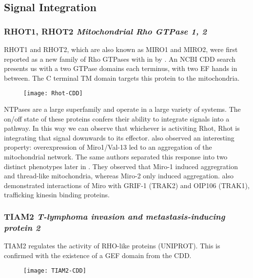 \subsection{Signal Integration}

\subsubsection{RHOT1, RHOT2 \textit{Mitochondrial Rho GTPase 1, 2}}

RHOT1 and RHOT2, which are also known as MIRO1 and MIRO2, were first reported as
a new family of Rho GTPases with in \citeyear{Fransson2003} by
\citeauthor{Fransson2003}. An NCBI CDD search presents us with a two GTPase
domains each terminus, with two EF hands in between. The C terminal TM domain
targets this protein to the mitochondria.

\begin{figure}[h]
  \texttt{[image: Rhot-CDD]}
\end{figure}

NTPases are a large superfamily and operate in a large variety of systems. The
on/off state of these proteins confers their ability to integrate signals into a
pathway. In this way we can observe that whichever is activiting Rhot, Rhot is
integrating that signal downwards to its effector. \citeauthor{Fransson2003}
also observed an interesting property: overexpression of Miro1/Val-13 led to
an aggregation of the mitochondrial network. The same authors separated this
response into two distinct phenotypes later in \citeyear{Fransson2006}. They
observed that Miro-1 induced aggregration and thread-like mitochondria, whereas
Miro-2 only induced aggregation. \citeauthor{Fransson2006} also demonstrated
interactions of Miro with GRIF-1 (TRAK2) and OIP106 (TRAK1), trafficking
kinesin binding proteins.


\subsubsection{TIAM2 \textit{T-lymphoma invasion and metastasis-inducing protein 2}}

TIAM2 regulates the activity of RHO-like proteins (UNIPROT). This is confirmed
with the existence of a GEF domain from the CDD.

\begin{figure}[h]
  \texttt{[image: TIAM2-CDD]}
\end{figure}

